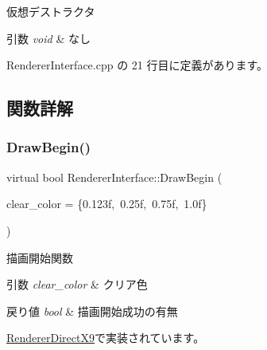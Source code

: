 仮想デストラクタ 


\begin{DoxyParams}{引数}
{\em void} & なし \\
\hline
\end{DoxyParams}


 Renderer\+Interface.\+cpp の 21 行目に定義があります。



\subsection{関数詳解}
\mbox{\label{class_renderer_interface_a8fad8e69ef40358a29e8dd75e4dbc7bd}} 
\subsubsection{\texorpdfstring{Draw\+Begin()}{DrawBegin()}}
{\footnotesize\ttfamily virtual bool Renderer\+Interface\+::\+Draw\+Begin (\begin{DoxyParamCaption}\item[{\mbox{\hyperlink{_vector3_d_8h_a680c30c4a07d86fe763c7e01169cd6cc}{X\+Color4}}}]{clear\+\_\+color = {\ttfamily \{0.123f,~0.25f,~0.75f,~1.0f\}} }\end{DoxyParamCaption})\hspace{0.3cm}{\ttfamily [pure virtual]}}



描画開始関数 


\begin{DoxyParams}{引数}
{\em clear\+\_\+color} & クリア色 \\
\hline
\end{DoxyParams}

\begin{DoxyRetVals}{戻り値}
{\em bool} & 描画開始成功の有無 \\
\hline
\end{DoxyRetVals}


\mbox{\hyperlink{class_renderer_direct_x9_a5d299c19850d7c87340c3cbf2629cc01}{Renderer\+Direct\+X9}}で実装されています。

\mbox{\label{class_renderer_interface_a0034a44420e4746062e70e4d66d3bee2}} 
